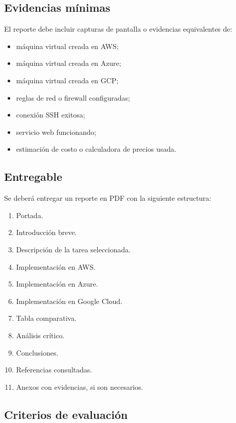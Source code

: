 \documentclass[
  coursetitle={Cómputo Nube y Tecnologías Emergentes},
  coursehours={96},
  coursedate={Verano 2026},
  doctype={Tarea 1},
  otherlangs={english,french},
  authorname={Lázaro},
  authorsurname={Bustio-Martínez},
  authortitle={PhD},
  role={Profesor Investigador},
  email={lbustio@inaoe.mx},
  phone={5559504000},
  ext={7459},
  institution={Instituto Nacional de Astrofísica, Óptica y Electrónica (INAOE)},
  department={Maestría en Ciencias en Tecnologías de Seguridad},
  address={Luis Enrique Erro 1, Sta. Ma. Tonantzintla, San Andrés Cholula, CP 72840, Puebla, México},
  margin={0.5in}
]{lbustio_lecture_notes}
\begin{document}
\subsection{Evidencias mínimas}
\label{sec:tarea1-evidencias}

El reporte debe incluir capturas de pantalla o evidencias equivalentes de:

\begin{itemize}
  \item máquina virtual creada en AWS;
  \item máquina virtual creada en Azure;
  \item máquina virtual creada en GCP;
  \item reglas de red o firewall configuradas;
  \item conexión SSH exitosa;
  \item servicio web funcionando;
  \item estimación de costo o calculadora de precios usada.
\end{itemize}

\subsection{Entregable}
\label{sec:tarea1-entregable}

Se deberá entregar un reporte en PDF con la siguiente estructura:

\begin{enumerate}
  \item Portada.
  \item Introducción breve.
  \item Descripción de la tarea seleccionada.
  \item Implementación en AWS.
  \item Implementación en Azure.
  \item Implementación en Google Cloud.
  \item Tabla comparativa.
  \item Análisis crítico.
  \item Conclusiones.
  \item Referencias consultadas.
  \item Anexos con evidencias, si son necesarios.
\end{enumerate}

\subsection{Criterios de evaluación}
\label{sec:tarea1-criterios}
\end{document}
